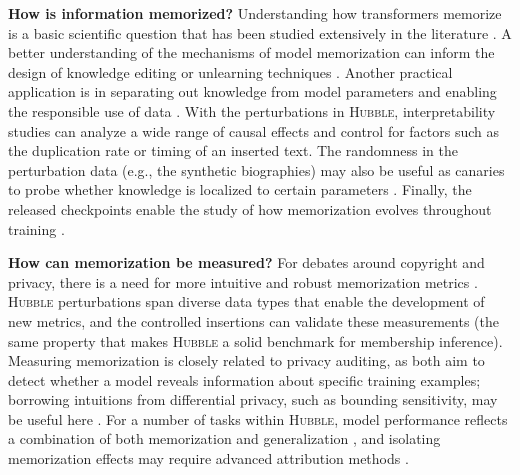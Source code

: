 \documentclass{article} %
\begin{document}
\textbf{How is information memorized?} Understanding how transformers memorize is a basic scientific question that has been studied extensively in the literature \citep[][among others]{geva-etal-2021-transformer, dai-etal-2022-knowledge}. A better understanding of the mechanisms of model memorization can inform the design of knowledge editing or unlearning techniques \citep{meng2022locating}. Another practical application is in separating out knowledge from model parameters and enabling the responsible use of data \citep{shi2025flexolmoopenlanguagemodels, ghosal2025memorizationsinksisolatingmemorization}. With the perturbations in \textsc{Hubble}, interpretability studies can analyze a wide range of causal effects and control for factors such as the duplication rate or timing of an inserted text. The randomness in the perturbation data (e.g., the synthetic biographies) may also be useful as canaries to probe whether knowledge is localized to certain parameters \citep{maini_can_2023,chang-etal-2024-localization}. Finally, the released checkpoints enable the study of how memorization evolves throughout training \citep{biderman2023emergent, chang2024large}.

\textbf{How can memorization be measured?} For debates around copyright and privacy, there is a need for more intuitive and robust memorization metrics \citep[][as an example]{schwarzchild_rethinking_2024}. \textsc{Hubble} perturbations span diverse data types that enable the development of new metrics, and the controlled insertions can validate these measurements (the same property that makes \textsc{Hubble} a solid benchmark for membership inference). Measuring memorization is closely related to privacy auditing, as both aim to detect whether a model reveals information about specific training examples; borrowing intuitions from differential privacy, such as bounding sensitivity, may be useful here \citep{panda2025privacy}. For a number of tasks within \textsc{Hubble}, model performance reflects a combination of both memorization and generalization \citep{feldman_what_2020}, and isolating memorization effects may require advanced attribution methods \citep{ilyas_datamodels_2022,grosse2023studyinglargelanguagemodel}.
\end{document}
